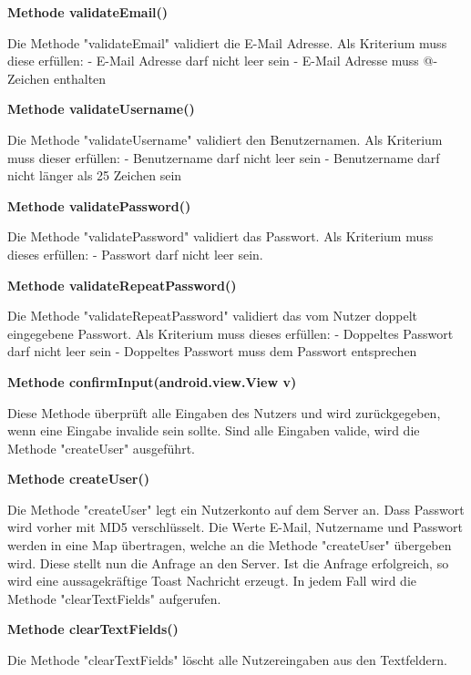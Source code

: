 \documentclass{scrartcl}
\begin{document}
\noindent\textbf{Methode validateEmail()}
 
\noindent Die Methode "validateEmail" validiert die E-Mail Adresse. Als Kriterium muss diese erfüllen: - E-Mail Adresse darf nicht leer sein - E-Mail Adresse muss @-Zeichen enthalten \newline 

\noindent\textbf{Methode validateUsername()}
 
\noindent Die Methode "validateUsername" validiert den Benutzernamen. Als Kriterium muss dieser erfüllen: - Benutzername darf nicht leer sein - Benutzername darf nicht länger als 25 Zeichen sein \newline 

\noindent\textbf{Methode validatePassword()}
 
\noindent Die Methode "validatePassword" validiert das Passwort. Als Kriterium muss dieses erfüllen: - Passwort darf nicht leer sein. \newline

\noindent\textbf{Methode validateRepeatPassword()}
 
\noindent Die Methode "validateRepeatPassword" validiert das vom Nutzer doppelt eingegebene Passwort. Als Kriterium muss dieses erfüllen: - Doppeltes Passwort darf nicht leer sein - Doppeltes Passwort muss dem Passwort entsprechen \newline 

\noindent\textbf{Methode confirmInput(android.view.View v)}
 
\noindent Diese Methode überprüft alle Eingaben des Nutzers und wird zurückgegeben, wenn eine Eingabe invalide sein sollte. Sind alle Eingaben valide, wird die Methode "createUser" ausgeführt. \newline 

\noindent\textbf{Methode createUser()}
 
\noindent Die Methode "createUser" legt ein Nutzerkonto auf dem Server an. Dass Passwort wird vorher mit MD5 verschlüsselt. Die Werte E-Mail, Nutzername und Passwort werden in eine Map übertragen, welche an die Methode "createUser" übergeben wird. Diese stellt nun die Anfrage an den Server. Ist die Anfrage erfolgreich, so wird eine aussagekräftige Toast Nachricht erzeugt. In jedem Fall wird die Methode "clearTextFields" aufgerufen. \newline 

\noindent\textbf{Methode clearTextFields()}
 
\noindent Die Methode "clearTextFields" löscht alle Nutzereingaben aus den Textfeldern. \newline
\end{document}
